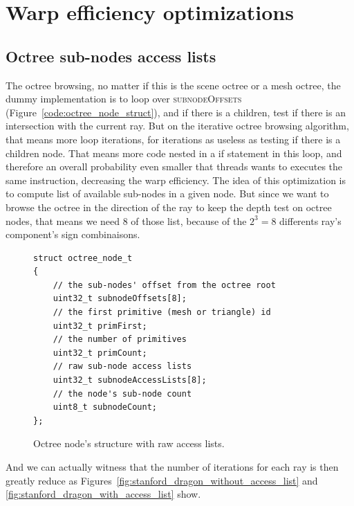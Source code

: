\documentclass[10pt,twocolumn,a4paper]{article}
\begin{document}
\section{Warp efficiency optimizations}
\subsection{Octree sub-nodes access lists}
The octree browsing, no matter if this is the scene octree or a mesh octree,
the dummy implementation is to loop over \textsc{subnodeOffsets}
(Figure~\ref{code:octree_node_struct}), and if there is a children, test if
there is an intersection with the current ray. But on the iterative octree
browsing algorithm, that means more loop iterations, for iterations as useless
as testing if there is a children node. That means more code nested in a if
statement in this loop, and therefore an overall probability even smaller that
threads wants to executes the same instruction, decreasing the warp efficiency.
The idea of this optimization is to compute list of available sub-nodes in
a given node. But since we want to browse the octree in the direction of the
ray to keep the depth test on octree nodes, that means we need 8 of those list,
because of the $2^3 = 8$ differents ray's component's sign combinaisons.

\begin{figure}[H]
    \centering
    \begin{lstlisting}[morekeywords={uint8_t,uint32_t}]
struct octree_node_t
{
    // the sub-nodes' offset from the octree root
    uint32_t subnodeOffsets[8];
    // the first primitive (mesh or triangle) id
    uint32_t primFirst;
    // the number of primitives
    uint32_t primCount;
    // raw sub-node access lists
    uint32_t subnodeAccessLists[8];
    // the node's sub-node count
    uint8_t subnodeCount;
};
    \end{lstlisting}
    \caption{Octree node's structure with raw access lists.}
    \label{code:raw_access_list}
\end{figure}

And we can actually witness that the number of iterations for each ray is
then greatly reduce as Figures~\ref{fig:stanford_dragon_without_access_list} and
\ref{fig:stanford_dragon_with_access_list} show.
\end{document}
